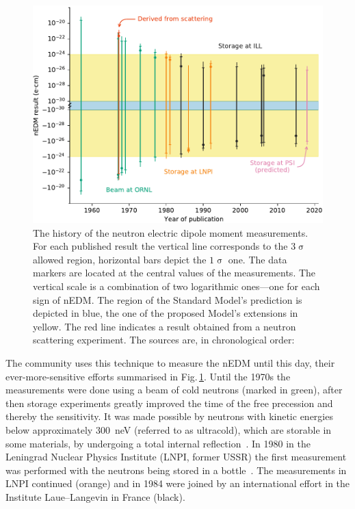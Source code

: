 \begin{figure}
  \centering
  \includegraphics[width=\linewidth]{gfx/introduction/edm_limits.pdf}
  \caption{The history of the neutron electric dipole moment measurements. For each published result the vertical line corresponds to the $3\upsigma$ allowed region, horizontal bars depict the $1\upsigma$ one. The data markers are located at the central values of the measurements. The vertical scale is a combination of two logarithmic ones---one for each sign of nEDM\@. The region of the Standard Model's prediction is depicted in blue, the one of the proposed Model's extensions in yellow. The red line indicates a result obtained from a neutron scattering experiment. The sources are, in chronological order:~\cite{PhysRev.108.120,PhysRevLett.19.381,PhysRevLett.19.384,PhysRev.170.1200,PhysRev.179.1285,PhysRevD.7.3147,PhysRevD.15.9,ALTAREV1980269,ALTAREV198113,altarev1986search,ALTAREV1992242,PENDLEBURY1984327,SMITH1990191,PhysRevLett.82.904,PhysRevLett.97.131801,Pendlebury2015}}\label{fig:nEDM_limits_history}
\end{figure}

The community uses this technique to measure the nEDM until this day, their ever-more-sensitive efforts summarised in Fig.\,\ref{fig:nEDM_limits_history}. Until the 1970s the measurements were done using a beam of cold neutrons (marked in green), after then storage experiments greatly improved the time of the free precession and thereby the sensitivity. It was made possible by neutrons with kinetic energies below approximately \SI{300}{\nano\electronvolt} (referred to as ultracold), which are storable in some materials, by undergoing a total internal reflection~\cite{UCNbook}. In 1980 in the Leningrad Nuclear Physics Institute (LNPI, former USSR) the first measurement was performed with the neutrons being stored in a bottle~\cite{ALTAREV1980269}. The measurements in LNPI continued (orange) and in 1984 were joined by an international effort in the Institute Laue--Langevin in France (black).

